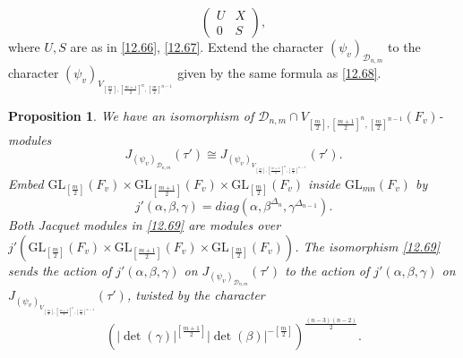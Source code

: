 \documentclass[12pts]{amsart}
\newcommand{\GL}{{\mathrm{GL}}}
\newtheorem{prop}[thm]{Proposition}
\begin{document}
$$
\begin{pmatrix}U&X\\0&S\end{pmatrix},
$$
where $U, S$ are as in \eqref{12.66}, \eqref{12.67}. Extend the character $(\psi_v)_{\mathcal{D}_{n,m}}$ to the character $(\psi_v)_{V_{[\frac{m}{2}],[\frac{m+1}{2}]^n,[\frac{m}{2}]^{n-1}}}$ given by the same formula as \eqref{12.68}. 
\begin{prop}\label{prop 12.9}
We have an isomorphism of $\mathcal{D}_{n,m}\cap V_{[\frac{m}{2}],[\frac{m+1}{2}]^n,[\frac{m}{2}]^{n-1}}(F_v)$-modules
\begin{equation}\label{12.69}
J_{(\psi_v)_{\mathcal{D}_{n,m}}}(\tau')\cong J_{(\psi_v)_{V_{[\frac{m}{2}],[\frac{m+1}{2}]^n,[\frac{m}{2}]^{n-1}}}}(\tau').
\end{equation}
Embed $\GL_{[\frac{m}{2}]}(F_v)\times \GL_{[\frac{m+1}{2}]}(F_v)\times \GL_{[\frac{m}{2}]}(F_v)$ inside $\GL_{mn}(F_v)$ by
\begin{equation}\label{12.70}
j'(\alpha,\beta,\gamma)=diag(\alpha, \beta^{\Delta_n},\gamma^{\Delta_{n-1}}). 
\end{equation}
Both Jacquet modules in \eqref{12.69} are modules over $j'(\GL_{[\frac{m}{2}]}(F_v)\times \GL_{[\frac{m+1}{2}]}(F_v)\times \GL_{[\frac{m}{2}]}(F_v))$. The isomorphism \eqref{12.69} sends the action of $j'(\alpha, \beta, \gamma)$ on $J_{(\psi_v)_{\mathcal{D}_{n,m}}}(\tau')$ to the action of $j'(\alpha, \beta, \gamma)$ on $J_{(\psi_v)_{V_{[\frac{m}{2}],[\frac{m+1}{2}]^n,[\frac{m}{2}]^{n-1}}}}(\tau')$, twisted by the character
\begin{equation}\label{12.71} (|\det(\gamma)|^{[\frac{m+1}{2}]}|\det(\beta)|^{-[\frac{m}{2}]})^{\frac{(n-3)(n-2)}{2}}.
\end{equation}
\end{prop}
\end{document}
